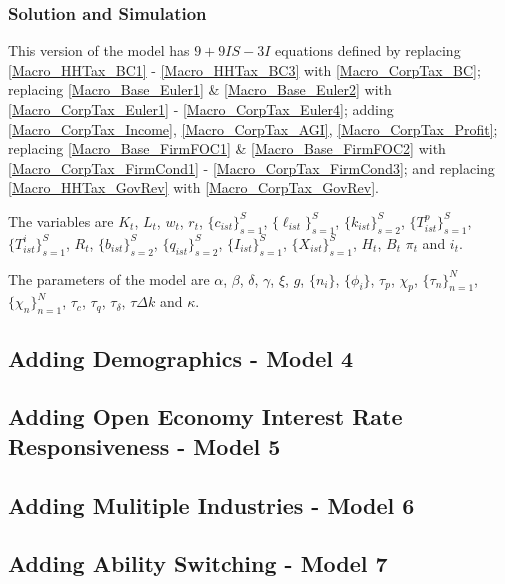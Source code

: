 \documentclass[letterpaper,12pt]{article}
\theoremstyle{definition}
\numberwithin{equation}{section}
\begin{document}
\begin{spacing}{1.5}
    \subsubsection{Solution and Simulation}
      This version of the model has $9+9IS-3I$ equations defined by replacing \eqref{Macro_HHTax_BC1} - \eqref{Macro_HHTax_BC3} with \eqref{Macro_CorpTax_BC}; replacing \eqref{Macro_Base_Euler1} \& \eqref{Macro_Base_Euler2} with \eqref{Macro_CorpTax_Euler1} - \eqref{Macro_CorpTax_Euler4}; adding \eqref{Macro_CorpTax_Income}, \eqref{Macro_CorpTax_AGI}, \eqref{Macro_CorpTax_Profit}; replacing \eqref{Macro_Base_FirmFOC1} \& \eqref{Macro_Base_FirmFOC2} with \eqref{Macro_CorpTax_FirmCond1} - \eqref{Macro_CorpTax_FirmCond3}; and replacing \eqref{Macro_HHTax_GovRev} with \eqref{Macro_CorpTax_GovRev}.  

      The variables are $K_t$, $L_t$, $w_t$, $r_t$, $\{c_{ist}\}_{s=1}^S$, $\{\ell_{ist}\}_{s=1}^S$, $\{k_{ist}\}_{s=2}^S$, $\{T^p_{ist}\}_{s=1}^S$, $\{T^i_{ist}\}_{s=1}^S$, $R_t$, $\{b_{ist}\}_{s=2}^S$, $\{q_{ist}\}_{s=2}^S$, $\{I_{ist}\}_{s=1}^S$, $\{X_{ist}\}_{s=1}^S$, $H_t$, $B_t$ $\pi_t$ and $i_t$.

      The parameters of the model are $\alpha$, $\beta$, $\delta$, $\gamma$, $\xi$, $g$, $\{n_i\}$, $\{\phi_i\}$, $\tau_p$, $\chi_p$, $\{\tau_n\}_{n=1}^N$, $\{\chi_n\}_{n=1}^N$, $\tau_c$, $\tau_q$, $\tau_\delta$, $\tau{\Delta k}$ and $\kappa$.

  \subsection{Adding Demographics - Model 4}\label{SubSec_Macro_Demog}

  \subsection{Adding Open Economy Interest Rate Responsiveness - Model 5}\label{SubSec_Macro_Open}

  \subsection{Adding Mulitiple Industries - Model 6}\label{SubSec_Macro_Multi}

  \subsection{Adding Ability Switching - Model 7}\label{SubSec_Macro_Switch}


\end{spacing}
\end{document}
